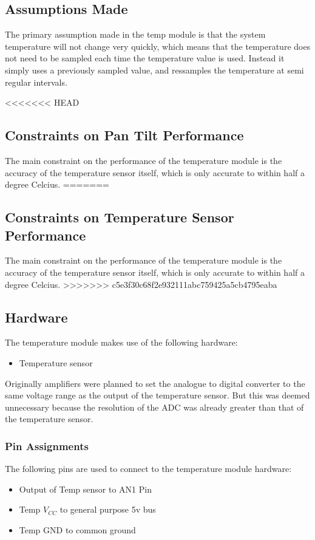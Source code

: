 \documentclass[]{report}
\begin{document}
\subsection{Assumptions Made}
The primary assumption made in the temp module is that the system temperature will not change very quickly, which means that the temperature does not need to be sampled each time the temperature value is used. Instead it simply uses a previously sampled value, and ressamples the temperature at semi regular intervals.

<<<<<<< HEAD
\subsection{Constraints on Pan Tilt Performance}
The main constraint on the performance of the temperature module is the accuracy of the temperature sensor itself, which is only accurate to within half a degree Celcius.
=======
\subsection{Constraints on Temperature Sensor Performance}
The main constraint on the performance of the temperature module is the accuracy of the temperature sensor itself, which is only accurate to within half a degree Celcius. 
>>>>>>> c5e3f30c68f2e932111abc759425a5cb4795eaba

\subsection{Hardware}
The temperature module makes use of the following hardware:
\begin{itemize}
	\item Temperature sensor
\end{itemize}
Originally amplifiers were planned to set the analogue to digital converter to the same voltage range as the output of the temperature sensor. But this was deemed unnecessary because the resolution of the ADC was already greater than that of the temperature sensor.

\subsubsection{Pin Assignments}
The following pins are used to connect to the temperature module hardware:
\begin{itemize}
	\item Output of Temp sensor to AN1 Pin
	\item Temp $V_{CC}$ to general purpose 5v bus
	\item Temp GND to common ground
\end{itemize}
\end{document}
